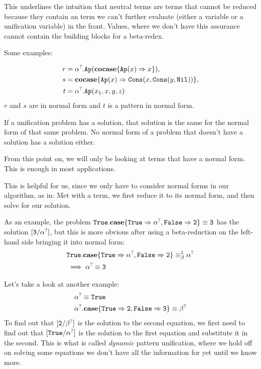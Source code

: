 \documentclass[twoside,12pt,a4paper]{article}
\begin{document}
This underlines the intuition that neutral terms are terms that cannot be reduced because
they contain an term we can't further evaluate (either a variable or a unification variable) in the front.
Values, where we don't have this assurance cannot contain the building blocks for a beta-redex.

Some examples: 
\begin{example}
\begin{align*}
    \begin{split}
        r &= \alpha^?.\texttt{Ap}(\textbf{cocase}\{\texttt{Ap}(x)\Rightarrow x\}), \\
        s &= \textbf{cocase}\{\texttt{Ap}(x)\Rightarrow \mathtt{Cons(\mathnormal{x}, Cons(\mathnormal{y}, Nil))}\},   \\
        t &= \alpha^?.\texttt{Ap}(x_1, x, y, z)
    \end{split}    
\end{align*}
$r$ and $s$ are in normal form and $t$ is a pattern in normal form.
\end{example}

\begin{theorem}
    If a unification problem has a solution, that solution is the same for the normal form of that same problem. 
    No normal form of a problem that doesn't have a solution has a solution either.
\end{theorem}

From this point on, we will only be looking at terms that have a normal form. This is enough in most applications. %

This is helpful for us, since we only have to consider normal forms in our algorithm, as in: 
Met with a term, we first reduce it to its normal form, and then solve for our solution.

As an example, the problem $\mathtt{True}.\textbf{case}\{\mathtt{True} \Rightarrow \alpha^?, \mathtt{False} \Rightarrow \mathtt{2}\} \equiv \mathtt{3} $ has the solution $[\mathtt{3/\alpha^?}]$, 
but this is more obvious after using a beta-reduction on the left-hand side bringing it into normal form:
\begin{align*}
    &\mathtt{True}.\textbf{case}\{\mathtt{True} \Rightarrow \alpha^?, \mathtt{False} \Rightarrow \mathtt{2}\} \equiv_{\beta}^1 \alpha^?  \\
    &\implies \alpha^? \equiv \mathtt{3}   
\end{align*}

Let's take a look at another example:
\begin{align*}
    &\alpha^? \equiv \mathtt{True} \\
    &\alpha^?.\textbf{case}\{\mathtt{True\Rightarrow 2, False\Rightarrow 3}\} \equiv \beta^?
\end{align*}
To find out that $[\mathtt{2}/\beta^?]$ is the solution to the second equation, we first need to find out that
$[\mathtt{True}/\alpha^?]$ is the solution to the first equation and substitute it in the second.
This is what is called \textit{dynamic} pattern unification, where we hold off on solving some equations we don't have all the information for yet until we know more. 
\end{document}
